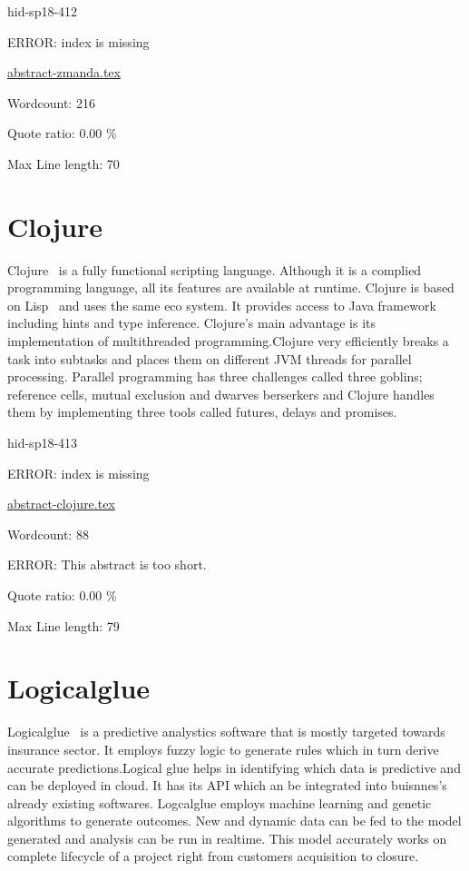 \begin{IU}

hid-sp18-412

ERROR: index is missing

\href{https://github.com/cloudmesh-community/hid-sp18-412/blob/master//technology/abstract-zmanda.tex}{abstract-zmanda.tex}

 

Wordcount: 216


Quote ratio: 0.00 \%
 
Max Line length: 70
\end{IU}

\section{Clojure}

Clojure~\cite{hid-sp18-413-clojure} is a fully functional scripting
language. Although it is a complied programming language, all its features are
available at runtime. Clojure is based on Lisp~\cite{hid-sp18-413-lisp} and
uses the same eco system. It provides access to Java framework including hints
and type inference. Clojure's main advantage is its implementation of
multithreaded programming.Clojure very efficiently breaks a task into subtasks
and places them on different JVM threads for parallel processing. Parallel
programming has three challenges called three goblins; reference cells, mutual
exclusion and dwarves berserkers and Clojure handles them by implementing three
tools called futures, delays and promises.


\begin{IU}

hid-sp18-413

ERROR: index is missing

\href{https://github.com/cloudmesh-community/hid-sp18-413/blob/master//technology/abstract-clojure.tex}{abstract-clojure.tex}

 

Wordcount: 88

ERROR: This abstract is too short.


Quote ratio: 0.00 \%
 
Max Line length: 79
\end{IU}

\section{Logicalglue}

Logicalglue~\cite{hid-sp18-413-logicalglue} is a predictive analystics software
that is mostly targeted towards insurance sector. It employs fuzzy logic to
generate rules which in turn derive accurate predictions.Logical glue helps in
identifying which data is predictive and can be deployed in cloud. It has its
API which an be integrated into buisnnes's already existing
softwares. Logcalglue employs machine learning and genetic algorithms to
generate outcomes. New and dynamic data can be fed to the model generated and
analysis can be run in realtime. This model accurately works on complete
lifecycle of a project right from customers acquisition to closure.


